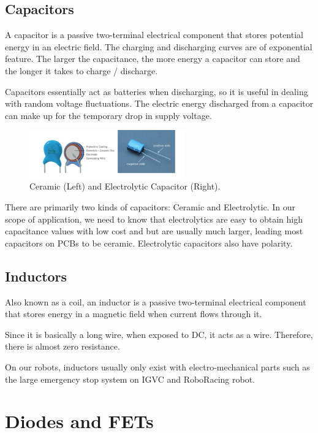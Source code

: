 \documentclass{article}
\begin{document}
\subsection{Capacitors}

A capacitor is a passive two-terminal electrical component that stores potential energy in an electric field. The charging and discharging curves are of exponential feature. The larger the capacitance, the more energy a capacitor can store and the longer it takes to charge / discharge. \par 
Capacitors essentially act as batteries when discharging, so it is useful in dealing with random voltage fluctuations. The electric energy discharged from a capacitor can make up for the temporary drop in supply voltage.

\begin{figure}[!h]
	\center
	\includegraphics[width=0.6\textwidth, keepaspectratio]{ceramicvelectro}
	\caption{Ceramic (Left) and Electrolytic Capacitor (Right).}
	\label{fig:capacitortype}
\end{figure}

There are primarily two kinds of capacitors: Ceramic and Electrolytic. In our scope of application, we need to know that electrolytics are easy to obtain high capacitance values with low cost and but are usually much larger, leading most capacitors on PCBs to be ceramic. Electrolytic capacitors also have polarity.

\subsection{Inductors}

Also known as a coil, an inductor is a passive two-terminal electrical component that stores energy in a magnetic field when current flows through it. \par
Since it is basically a long wire, when exposed to DC, it acts as a wire. Therefore, there is almost zero resistance. \par
On our robots, inductors usually only exist with electro-mechanical parts such as the large emergency stop system on IGVC and RoboRacing robot.

\section{Diodes and FETs}
\end{document}
